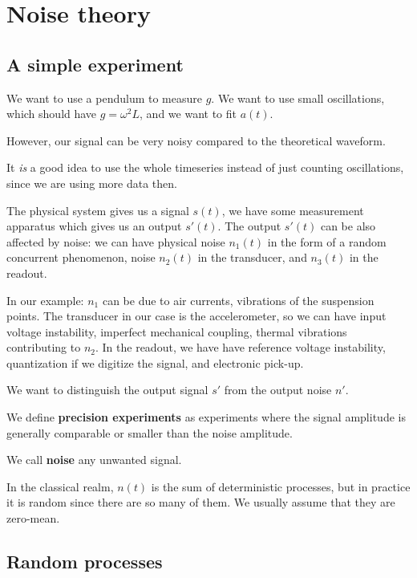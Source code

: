 \documentclass[main.tex]{subfiles}
\begin{document}
\section{Noise theory}

\subsection{A simple experiment}


We want to use a pendulum to measure \(g\). We want to use small oscillations, which should have \(g = \omega^2L\), and we want to fit \(a(t)\).

However, our signal can be very noisy compared to the theoretical waveform. 

It \emph{is} a good idea to use the whole timeseries instead of just counting oscillations, since we are using more data then. 

The physical system gives us a signal \(s(t)\), we have some measurement apparatus which gives us an output \(s'(t)\).
The output \(s'(t)\) can be also affected by noise: we can have physical noise \(n_1 (t)\) in the form of a random concurrent phenomenon, noise \(n_2 (t)\) in the transducer, and \(n_3 (t)\) in the readout. 

In our example: \(n_1 \) can be due to air currents, vibrations of the suspension points. The transducer in our case is the accelerometer, so we can have input voltage instability, imperfect mechanical coupling, thermal vibrations contributing to \(n_2 \). 
In the readout, we have have reference voltage instability, quantization if we digitize the signal, and electronic pick-up.

We want to distinguish the output signal \(s'\) from the output noise \(n'\).

We define \textbf{precision experiments} as experiments where the signal amplitude is generally comparable or smaller than the noise amplitude.

We call \textbf{noise} any unwanted signal. 

In the classical realm, \(n(t)\) is the sum of deterministic processes, but in practice it is random since there are so many of them. We usually assume that they are zero-mean.

\subsection{Random processes}
\end{document}
